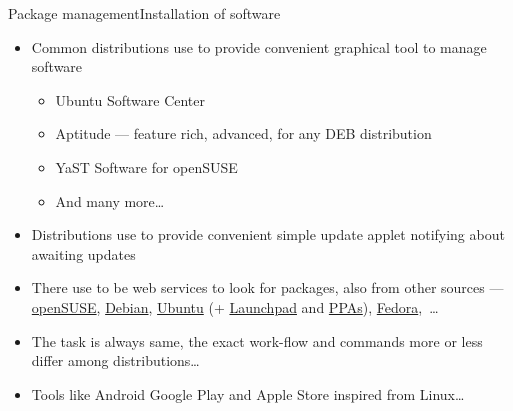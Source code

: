 \documentclass[compress, ucs, xelatex, 11pt, xcolor=svgnames,
  hyperref={
    bookmarks=true,
    unicode=true,
    colorlinks=true,
    pdftitle={Linux, command line and MetaCentrum},
    plainpages=false,
    pdfauthor={Vojtech Zeisek},
    pdfsubject={Course about use of Linux command line, writing shell scripts and using MetaCentrum of CESNET},
    pdfcreator={XeLaTeX},
    pdfkeywords={Linux, GNU, BASH, shell, command line, MetaCentrum},
    linkcolor=DarkRed,
    anchorcolor=DarkBlue,
    citecolor=Indigo,
    filecolor=NavyBlue,
    menucolor=DarkMagenta,
    urlcolor=DarkBlue,
    pdftex},
  url={hyphens, lowtilde} %
  ]{beamer}
\begin{document}
\begin{frame}[allowframebreaks]{Package management}{Installation of software}
\begin{itemize}
    \item Common distributions use to provide convenient graphical tool to manage software
    \begin{itemize}
      \item Ubuntu Software Center
      \item Aptitude --- feature rich, advanced, for any DEB distribution
      \item YaST Software for openSUSE
      \item And many more\ldots
    \end{itemize}
    \item Distributions use to provide convenient simple update applet notifying about awaiting updates
    \item There use to be web services to look for packages, also from other sources --- \href{https://software.opensuse.org/search}{openSUSE}, \href{https://www.debian.org/distrib/packages\#search_packages}{Debian}, \href{https://packages.ubuntu.com/}{Ubuntu} (+ \href{https://launchpad.net/ubuntu/+search}{Launchpad} and \href{https://launchpad.net/ubuntu/+ppas}{PPAs}), \href{https://apps.fedoraproject.org/packages/}{Fedora},~\ldots
    \item The task is always same, the exact work-flow and commands more or less differ among distributions\ldots
    \item Tools like Android Google Play and Apple Store inspired from Linux\ldots
  \end{itemize}
\end{frame}
\end{document}
